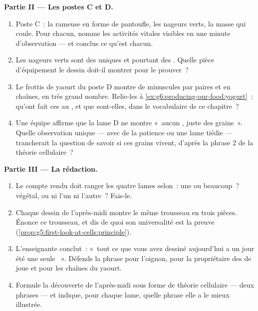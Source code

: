 \begin{problem}
\medskip\noindent\textbf{Partie II --- Les postes C et D.}
\begin{enumerate}[resume]
  \item Poste C~: la rameuse en forme de pantoufle, les nageurs
        verts, la masse qui coule. Pour chacun, nomme les
        activités vitales visibles en une minute d'observation ---
        et conclus ce qu'est chacun.
  \item Les nageurs verts sont des  uniques et pourtant des
        . Quelle pièce d'équipement le dessin doit-il
        montrer pour le prouver~?
  \item Le frottis de yaourt du poste D montre de minuscules
         par paires et en chaînes, en très grand nombre.
        Relie-les à \cref{ex:g6:producing-our-food:yogurt}~: qu'ont
        fait ces  au , et que sont-elles, dans le
        vocabulaire de ce chapitre~?
  \item Une équipe affirme que la lame D ne montre «~aucun , juste des grains~». Quelle observation unique ---
        avec de la patience ou une lame tiédie --- trancherait la
        question de savoir si ces grains vivent, d'après la phrase
        2 de la théorie cellulaire~?
\end{enumerate}

\medskip\noindent\textbf{Partie III --- La rédaction.}
\begin{enumerate}[resume]
  \item Le compte rendu doit ranger les quatre lames selon~: une
         ou beaucoup~? végétal,  ou ni l'un ni
        l'autre~? Fais-le.
  \item Chaque dessin de l'après-midi montre le même trousseau en
        trois pièces. Énonce ce trousseau, et dis de quoi son
        universalité est la preuve
        (\cref{prop:g5:first-look-at-cells:principle}).
  \item L'enseignante conclut~: «~tout ce que vous avez dessiné
        aujourd'hui a un jour été une seule ~». Défends la
        phrase pour l'oignon, pour la propriétaire des  de
        joue et pour les chaînes du yaourt.
  \item Formule la découverte de l'après-midi sous forme de théorie
        cellulaire --- deux phrases --- et indique, pour chaque
        lame, quelle phrase elle a le mieux illustrée.
\end{enumerate}
\end{problem}
